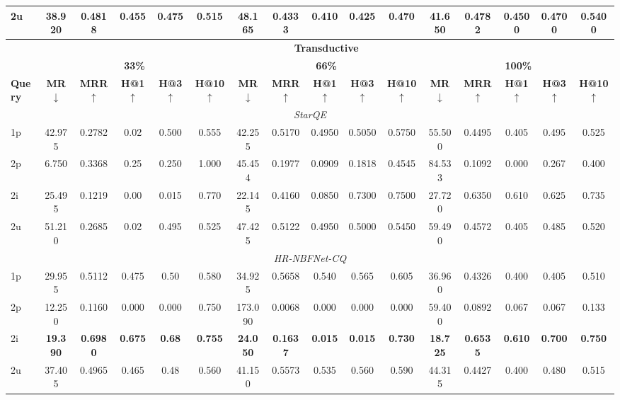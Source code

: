\documentclass[10pt,journal,compsoc]{IEEEtran}
\begin{document}
\begin{table}[t]
{\begin{tabular}{l ccccc ccccc ccccc}
2u & 38.920 & 0.4818 & 0.455 & 0.475 & 0.515 &  48.165 & 0.4333 & 0.410 & 0.425 & 0.470 & 41.650 & 0.4782 & 0.4500 & 0.4700 & 0.5400 \\
\midrule\midrule
 & \multicolumn{15}{c}{\textbf{Transductive}} \\ \toprule
 & \multicolumn{5}{c}{\textbf{33\%}} & \multicolumn{5}{c}{\textbf{66\%}} & \multicolumn{5}{c}{\textbf{100\%}} \\
\cmidrule(lr){2-6} \cmidrule(lr){7-11} \cmidrule(lr){12-16}
\textbf{Query}
  & \textbf{MR} $\downarrow$& \textbf{MRR} $\uparrow$& \textbf{H@1} $\uparrow$& \textbf{H@3} $\uparrow$& \textbf{H@10} $\uparrow$
  & \textbf{MR} $\downarrow$& \textbf{MRR} $\uparrow$& \textbf{H@1} $\uparrow$& \textbf{H@3} $\uparrow$& \textbf{H@10} $\uparrow$
  & \textbf{MR} $\downarrow$& \textbf{MRR} $\uparrow$& \textbf{H@1} $\uparrow$& \textbf{H@3} $\uparrow$& \textbf{H@10} $\uparrow$\\
\midrule
\multicolumn{16}{c}{\textit{StarQE}} \\
\midrule
1p & 42.975 & 0.2782 & 0.02 & 0.500 & 0.555 & 42.255 & 0.5170 & 0.4950 & 0.5050 & 0.5750 & 55.500 & 0.4495 & 0.405 & 0.495 & 0.525 \\
2p & 6.750 & 0.3368 & 0.25 & 0.250 & 1.000 & 45.454 & 0.1977 & 0.0909 & 0.1818 & 0.4545 & 84.533 & 0.1092 & 0.000 & 0.267 & 0.400 \\
\rowcolor{gray!15}
2i & 25.495 & 0.1219 & 0.00 & 0.015 & 0.770 & 22.145 & 0.4160 & 0.0850 & 0.7300 & 0.7500 & 27.720 & 0.6350 & 0.610 & 0.625 & 0.735 \\
2u & 51.210 & 0.2685 & 0.02 & 0.495 & 0.525 & 47.425 & 0.5122 & 0.4950 & 0.5000 & 0.5450 & 59.490 & 0.4572 & 0.405 & 0.485 & 0.520 \\
\midrule
\multicolumn{16}{c}{\textit{HR-NBFNet-CQ}} \\
\midrule
1p & 29.955 & 0.5112 & 0.475 & 0.50 & 0.580 & 34.925 & 0.5658 & 0.540 & 0.565 & 0.605 & 36.960 & 0.4326 & 0.400 & 0.405 & 0.510 \\
2p & 12.250 & 0.1160 & 0.000 & 0.000 & 0.750 & 173.090 & 0.0068 & 0.000 & 0.000 & 0.000 & 59.400 & 0.0892 & 0.067 & 0.067 & 0.133 \\
\rowcolor{gray!15}
2i & \textbf{19.390} & \textbf{0.6980} & \textbf{0.675} & \textbf{0.68} & \textbf{0.755} & \textbf{24.050} & \textbf{0.1637} & \textbf{0.015} & \textbf{0.015} & \textbf{0.730} & \textbf{18.725} & \textbf{0.6535} & \textbf{0.610} & \textbf{0.700} & \textbf{0.750} \\
2u & 37.405 & 0.4965 & 0.465 & 0.48 & 0.560 & 41.150 & 0.5573 & 0.535 & 0.560 & 0.590 & 44.315 & 0.4427 & 0.400 & 0.480 & 0.515 \\
\bottomrule
\end{tabular}%
}
\end{table}
\end{document}
